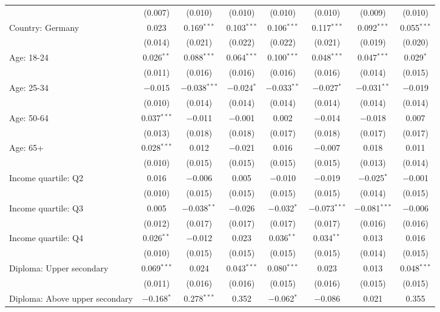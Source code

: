 \begin{tabular}{@{\extracolsep{5pt}}lccccccc}
  & (0.007) & (0.010) & (0.010) & (0.010) & (0.010) & (0.009) & (0.010) \\ 
  Country: Germany & 0.023 & 0.169$^{***}$ & 0.103$^{***}$ & 0.106$^{***}$ & 0.117$^{***}$ & 0.092$^{***}$ & 0.055$^{***}$ \\ 
  & (0.014) & (0.021) & (0.022) & (0.022) & (0.021) & (0.019) & (0.020) \\ 
  Age: 18\mbox{-}24 & 0.026$^{**}$ & 0.088$^{***}$ & 0.064$^{***}$ & 0.100$^{***}$ & 0.048$^{***}$ & 0.047$^{***}$ & 0.029$^{*}$ \\ 
  & (0.011) & (0.016) & (0.016) & (0.016) & (0.016) & (0.014) & (0.015) \\ 
  Age: 25\mbox{-}34 & $-$0.015 & $-$0.038$^{***}$ & $-$0.024$^{*}$ & $-$0.033$^{**}$ & $-$0.027$^{*}$ & $-$0.031$^{**}$ & $-$0.019 \\ 
  & (0.010) & (0.014) & (0.014) & (0.014) & (0.014) & (0.014) & (0.014) \\ 
  Age: 50\mbox{-}64 & 0.037$^{***}$ & $-$0.011 & $-$0.001 & 0.002 & $-$0.014 & $-$0.018 & 0.007 \\ 
  & (0.013) & (0.018) & (0.018) & (0.017) & (0.018) & (0.017) & (0.017) \\ 
  Age: 65+ & 0.028$^{***}$ & 0.012 & $-$0.021 & 0.016 & $-$0.007 & 0.018 & 0.011 \\ 
  & (0.010) & (0.015) & (0.015) & (0.015) & (0.015) & (0.013) & (0.014) \\ 
  Income quartile: Q2 & 0.016 & $-$0.006 & 0.005 & $-$0.010 & $-$0.019 & $-$0.025$^{*}$ & $-$0.001 \\ 
  & (0.010) & (0.015) & (0.015) & (0.015) & (0.015) & (0.014) & (0.015) \\ 
  Income quartile: Q3 & 0.005 & $-$0.038$^{**}$ & $-$0.026 & $-$0.032$^{*}$ & $-$0.073$^{***}$ & $-$0.081$^{***}$ & $-$0.006 \\ 
  & (0.012) & (0.017) & (0.017) & (0.017) & (0.017) & (0.016) & (0.016) \\ 
  Income quartile: Q4 & 0.026$^{**}$ & $-$0.012 & 0.023 & 0.036$^{**}$ & 0.034$^{**}$ & 0.013 & 0.016 \\ 
  & (0.010) & (0.015) & (0.015) & (0.015) & (0.015) & (0.014) & (0.015) \\ 
  Diploma: Upper secondary & 0.069$^{***}$ & 0.024 & 0.043$^{***}$ & 0.080$^{***}$ & 0.023 & 0.013 & 0.048$^{***}$ \\ 
  & (0.011) & (0.016) & (0.016) & (0.015) & (0.016) & (0.015) & (0.015) \\ 
  Diploma: Above upper secondary & $-$0.168$^{*}$ & 0.278$^{***}$ & 0.352 & $-$0.062$^{*}$ & $-$0.086 & 0.021 & 0.355 \\ 

\end{tabular}
